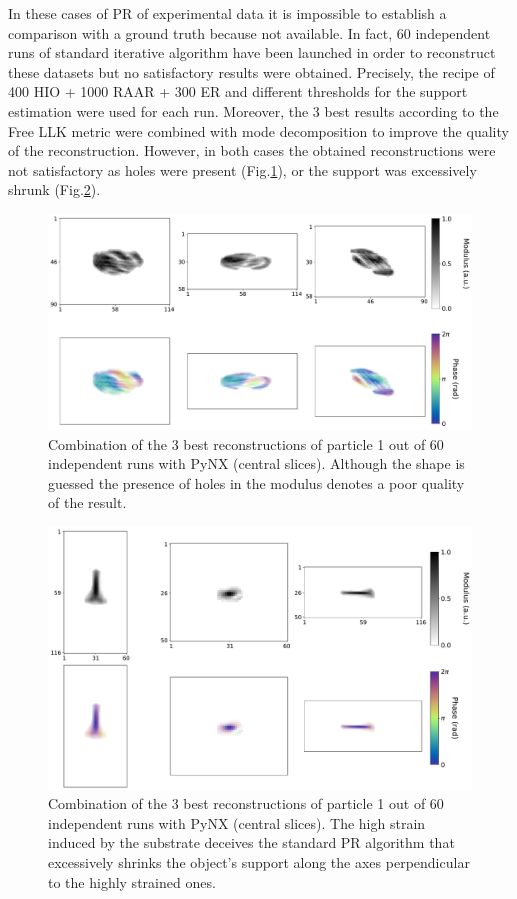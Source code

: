 In these cases of PR of experimental data it is impossible to establish a comparison with a ground truth because not available.
In fact, 60 independent runs of standard iterative algorithm have been launched in order to reconstruct these datasets but no satisfactory results 
were obtained. Precisely, the recipe of 400 HIO + 1000 RAAR + 300 ER and different thresholds for the support estimation
were used for each run. Moreover, the 3 best results according to the Free LLK metric \cite{favre-nicolin_free_2020} were 
combined with mode decomposition to improve the quality of the reconstruction. However, in both cases the obtained reconstructions 
were not satisfactory as holes were present (Fig.\ref{fig:pynx_rec1}), or the support was excessively shrunk (Fig.\ref{fig:pynx_rec2}).\\

\begin{figure}[H]
    \centering
    \includegraphics[width=\textwidth]{figures/Phasing/exp_data_pynx1.pdf}
    \caption{Combination of the 3 best reconstructions of particle 1 out of 60 independent runs with PyNX (central slices). 
    Although the shape is guessed the presence of holes in the modulus denotes a poor quality of the result.}
    \label{fig:pynx_rec1}
\end{figure}
\begin{figure}[H]
    \centering
    \includegraphics[width=\textwidth]{figures/Phasing/exp_data_pynx2.pdf}
    \caption{Combination of the 3 best reconstructions of particle 1 out of 60 independent runs with PyNX (central slices). 
    The high strain induced by the substrate deceives the standard PR algorithm that excessively shrinks the object's support 
    along the axes perpendicular to the highly strained ones. }
    \label{fig:pynx_rec2}
\end{figure}

